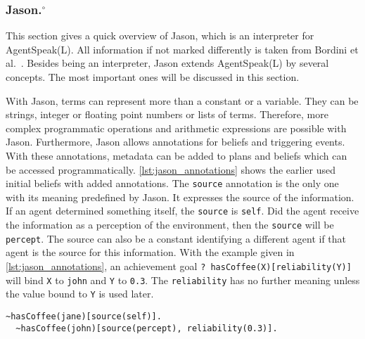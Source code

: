 \subsubsection[Jason.]{Jason.$^\circ$}
This section gives a quick overview of Jason, which is an interpreter for AgentSpeak(L). All information if not marked differently is taken from Bordini et al.~\cite{bordini_jason_2005}. Besides being an interpreter, Jason extends AgentSpeak(L) by several concepts. The most important ones will be discussed in this section.

With Jason, terms can represent more than a constant or a variable. They can be strings, integer or floating point numbers or lists of terms. Therefore, more complex programmatic operations and arithmetic expressions are possible with Jason. Furthermore, Jason allows annotations for beliefs and triggering events. With these annotations, metadata can be added to plans and beliefs which can be accessed programmatically. \autoref{lst:jason_annotations} shows the earlier used initial beliefs with added annotations. The \texttt{source} annotation is the only one with its meaning predefined by Jason. It expresses the source of the information. If an agent determined something itself, the \texttt{source} is \texttt{self}. Did the agent receive the information as a perception of the environment, then the \texttt{source} will be \texttt{percept}. The source can also be a constant identifying a different agent if that agent is the source for this information. With the example given in \autoref{lst:jason_annotations}, an achievement goal \texttt{?~hasCoffee(X)[reliability(Y)]} will bind \texttt{X} to \texttt{john} and \texttt{Y} to \texttt{0.3}. The \texttt{reliability} has no further meaning unless the value bound to \texttt{Y} is used later.
\begin{lstlisting}[caption={Annotation of beliefs in Jason.}, label=lst:jason_annotations]
  ~hasCoffee(jane)[source(self)].
  ~hasCoffee(john)[source(percept), reliability(0.3)].
\end{lstlisting}

